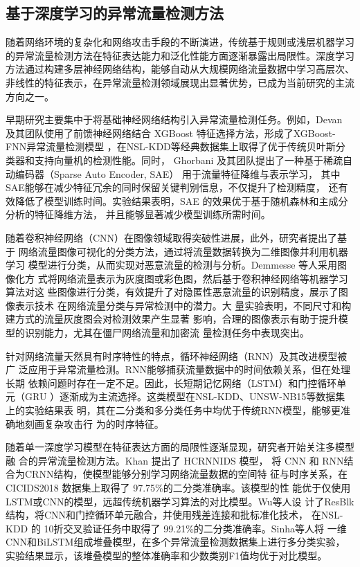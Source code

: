 \subsection{基于深度学习的异常流量检测方法}
随着网络环境的复杂化和网络攻击手段的不断演进，传统基于规则或浅层机器学习
的异常流量检测方法在特征表达能力和泛化性能方面逐渐暴露出局限性。深度学习
方法通过构建多层神经网络结构，能够自动从大规模网络流量数据中学习高层次、
非线性的特征表示，在异常流量检测领域展现出显著优势，已成为当前研究的主流方向之一。

早期研究主要集中于将基础神经网络结构引入异常流量检测任务。例如，Devan 
及其团队使用了前馈神经网络结合
XGBoost 特征选择方法，形成了XGBoost-FNN异常流量检测模型\cite{devan2020efficient}
，在NSL-KDD等经典数据集上取得了优于传统贝叶斯分类器和支持向量机的检测性能。同时，
Ghorbani 及其团队提出了一种基于稀疏自动编码器（Sparse Auto Encoder, SAE）
用于流量特征降维与表示学习\cite{ghorbani2022deep}，
其中SAE能够在减少特征冗余的同时保留关键判别信息，不仅提升了检测精度，
还有效降低了模型训练时间。实验结果表明，SAE 的效果优于基于随机森林和主成分分析的特征降维方法，
并且能够显著减少模型训练所需时间。

随着卷积神经网络（CNN）在图像领域取得突破性进展，此外，研究者提出了基于
网络流量图像可视化的分类方法，通过将流量数据转换为二维图像并利用机器学习
模型进行分类，从而实现对恶意流量的检测与分析。Demmesse 等人采用图像化方
式将网络流量表示为灰度图或彩色图，然后基于卷积神经网络等机器学习算法对这
些图像进行分类，有效提升了对隐匿性恶意流量的识别精度，展示了图像表示技术
在网络流量分类与异常检测中的潜力\cite{demmese2023machine}。大
量实验表明，不同尺寸和构建方式的流量灰度图会对检测效果产生显著
影响，合理的图像表示有助于提升模型的识别能力，尤其在僵尸网络流量和加密流
量检测任务中表现突出。

针对网络流量天然具有时序特性的特点，循环神经网络（RNN）及其改进模型被广
泛应用于异常流量检测。RNN能够捕获流量数据中的时间依赖关系，但在处理长期
依赖问题时存在一定不足。因此，长短期记忆网络（LSTM）和门控循环单元（GRU
）逐渐成为主流选择。这类模型在NSL-KDD、UNSW-NB15等数据集上的实验结果表
明，其在二分类和多分类任务中均优于传统RNN模型，能够更准确地刻画复杂攻击行
为的时序特征。

随着单一深度学习模型在特征表达方面的局限性逐渐显现，研究者开始关注多模型融
合的异常流量检测方法。Khan 提出了 HCRNNIDS 模型\cite{khan2021hcrnnids}，
将 CNN 和 RNN结合为CRNN结构，使模型能够分别学习网络流量数据的空间特
征与时序关系，在 CICIDS2018 数据集上取得了 97.75\%的二分类准确率。该模型的性
能优于仅使用LSTM或CNN的模型，远超传统机器学习算法的对比模型。Wu等人设
计了ResBlk结构\cite{wu2020pelican}，将CNN和门控循环单元融合，并使用残差连接和批标准化技术，
在NSL-KDD 的 10折交叉验证任务中取得了 99.21\%的二分类准确率。Sinha等人\cite{sinha2020efficient}将
一维CNN和BiLSTM组成堆叠模型，在多个异常流量检测数据集上进行多分类实验，
实验结果显示，该堆叠模型的整体准确率和少数类别F1值均优于对比模型。

